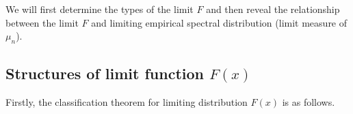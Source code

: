 \documentclass[12pt]{article}
\theoremstyle{plain}
\theoremstyle{definition}
\theoremstyle{remark}
\newtheorem{rem}{\textbf{Remark}}
\begin{document}

We will first determine the types of the limit $F$ and then reveal the relationship between the limit $F$ and limiting empirical spectral distribution (limit measure of $\mu_n$).




\subsection{Structures of limit function $F(x)$}

Firstly, the classification theorem for limiting distribution $F(x)$
is as follows.
\end{document}
